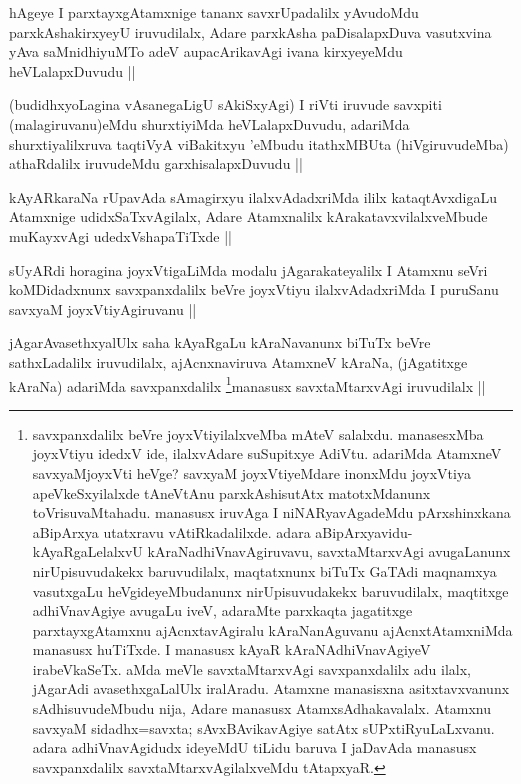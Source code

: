 \begin{artha}
hAgeye I parxtayxgAtamxnige tananx savxrUpadalilx yAvudoMdu parxkAshakirxyeyU iruvudilalx, Adare parxkAsha paDisalapxDuva vasutxvina yAva saMnidhiyuMTo adeV aupacArikavAgi ivana kirxyeyeMdu heVLalapxDuvudu ||
\end{artha}


\begin{artha}
(budidhxyoLagina vAsanegaLigU sAkiSxyAgi) I riVti iruvude savxpiti (malagiruvanu)eMdu shurxtiyiMda heVLalapxDuvudu, adariMda shurxtiyalilxruva taqtiVyA viBakitxyu \stext'eMbudu itathxMBUta (hiVgiruvudeMba) athaRdalilx iruvudeMdu garxhisalapxDuvudu ||
\end{artha}


\begin{artha}
kAyARkaraNa rUpavAda sAmagirxyu ilalxvAdadxriMda ililx kataqtAvxdigaLu Atamxnige udidxSaTxvAgilalx, Adare Atamxnalilx kArakatavxvilalxveMbude muKayxvAgi udedxVshapaTiTxde ||
\end{artha}


\begin{artha}
sUyARdi horagina joyxVtigaLiMda modalu jAgarakateyalilx I Atamxnu seVri koMDidadxnunx savxpanxdalilx beVre joyxVtiyu ilalxvAdadxriMda I puruSanu savxyaM joyxVtiyAgiruvanu || 
\end{artha}


\begin{artha}
jAgarAvasethxyalUlx saha kAyaRgaLu kAraNavanunx biTuTx beVre sathxLadalilx iruvudilalx, ajAcnxnaviruva AtamxneV kAraNa, (jAgatitxge kAraNa) adariMda savxpanxdalilx \footnote{savxpanxdalilx beVre joyxVtiyilalxveMba mAteV salalxdu. manasesxMba joyxVtiyu idedxV ide, ilalxvAdare suSupitxye AdiVtu. adariMda AtamxneV savxyaMjoyxVti heVge? savxyaM joyxVtiyeMdare inonxMdu joyxVtiya apeVkeSxyilalxde tAneVtAnu parxkAshisutAtx matotxMdanunx toVrisuvaMtahadu. manasusx iruvAga I niNARyavAgadeMdu pArxshinxkana aBipArxya utatxravu vAtiRkadalilxde. adara aBipArxyavidu-kAyaRgaLelalxvU kAraNadhiVnavAgiruvavu, savxtaMtarxvAgi avugaLanunx nirUpisuvudakekx baruvudilalx, maqtatxnunx biTuTx GaTAdi maqnamxya vasutxgaLu  heVgideyeMbudanunx nirUpisuvudakekx baruvudilalx, maqtitxge adhiVnavAgiye avugaLu iveV, adaraMte parxkaqta jagatitxge parxtayxgAtamxnu ajAcnxtavAgiralu kAraNanAguvanu ajAcnxtAtamxniMda manasusx huTiTxde. I manasusx kAyaR kAraNAdhiVnavAgiyeV irabeVkaSeTx. aMda meVle savxtaMtarxvAgi savxpanxdalilx adu ilalx, jAgarAdi avasethxgaLalUlx iralAradu. Atamxne manasisxna asitxtavxvanunx sAdhisuvudeMbudu nija, Adare manasusx AtamxsAdhakavalalx. Atamxnu savxyaM sidadhx=savxta; sAvxBAvikavAgiye satAtx sUPxtiRyuLaLxvanu. adara adhiVnavAgidudx ideyeMdU tiLidu baruva I jaDavAda manasusx savxpanxdalilx savxtaMtarxvAgilalxveMdu tAtapxyaR.}manasusx savxtaMtarxvAgi iruvudilalx ||
\end{artha}

